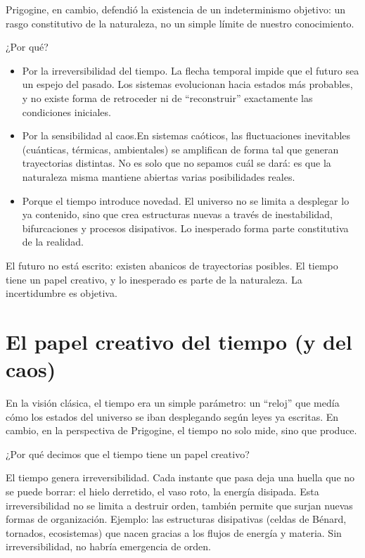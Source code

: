 \documentclass[
  11pt,
  a4paper,
  DIV=11,
  numbers=noendperiod]{scrreprt}
\begin{document}
Prigogine, en cambio, defendió la existencia de un indeterminismo
objetivo: un rasgo constitutivo de la naturaleza, no un simple límite de
nuestro conocimiento.

¿Por qué?

\begin{itemize}
\item
  Por la irreversibilidad del tiempo. La flecha temporal impide que el
  futuro sea un espejo del pasado. Los sistemas evolucionan hacia
  estados más probables, y no existe forma de retroceder ni de
  ``reconstruir'' exactamente las condiciones iniciales.
\item
  Por la sensibilidad al caos.En sistemas caóticos, las fluctuaciones
  inevitables (cuánticas, térmicas, ambientales) se amplifican de forma
  tal que generan trayectorias distintas. No es solo que no sepamos cuál
  se dará: es que la naturaleza misma mantiene abiertas varias
  posibilidades reales.
\item
  Porque el tiempo introduce novedad. El universo no se limita a
  desplegar lo ya contenido, sino que crea estructuras nuevas a través
  de inestabilidad, bifurcaciones y procesos disipativos. Lo inesperado
  forma parte constitutiva de la realidad.
\end{itemize}

El futuro no está escrito: existen abanicos de trayectorias posibles. El
tiempo tiene un papel creativo, y lo inesperado es parte de la
naturaleza. La incertidumbre es objetiva.

\chapter{El papel creativo del tiempo (y del
caos)}\label{el-papel-creativo-del-tiempo-y-del-caos}

En la visión clásica, el tiempo era un simple parámetro: un ``reloj''
que medía cómo los estados del universo se iban desplegando según leyes
ya escritas. En cambio, en la perspectiva de Prigogine, el tiempo no
solo mide, sino que produce.

¿Por qué decimos que el tiempo tiene un papel creativo?

El tiempo genera irreversibilidad. Cada instante que pasa deja una
huella que no se puede borrar: el hielo derretido, el vaso roto, la
energía disipada. Esta irreversibilidad no se limita a destruir orden,
también permite que surjan nuevas formas de organización. Ejemplo: las
estructuras disipativas (celdas de Bénard, tornados, ecosistemas) que
nacen gracias a los flujos de energía y materia. Sin irreversibilidad,
no habría emergencia de orden.
\end{document}
